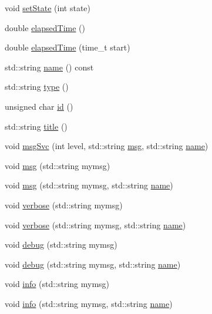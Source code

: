 \begin{DoxyCompactItemize}
void \hyperlink{classProcessus_ad38cde0f1bcefa00b068e7947b8af927}{set\+State} (int state)
\item 
double \hyperlink{classProcessus_aecca96218c65bc805c988cd95447df55}{elapsed\+Time} ()
\item 
double \hyperlink{classProcessus_a06d3815ad56593dfd0d3c1f534f8b146}{elapsed\+Time} (time\+\_\+t start)
\item 
std\+::string \hyperlink{classObject_a300f4c05dd468c7bb8b3c968868443c1}{name} () const
\item 
std\+::string \hyperlink{classObject_a84f99f70f144a83e1582d1d0f84e4e62}{type} ()
\item 
unsigned char \hyperlink{classObject_af99145335cc61ff6e2798ea17db009d2}{id} ()
\item 
std\+::string \hyperlink{classObject_a73a0f1a41828fdd8303dd662446fb6c3}{title} ()
\item 
void \hyperlink{classObject_a3f9d5537ebce0c0f2bf6ae4d92426f3c}{msg\+Svc} (int level, std\+::string \hyperlink{classObject_a58b2d0618c2d08cf2383012611528d97}{msg}, std\+::string \hyperlink{classObject_a300f4c05dd468c7bb8b3c968868443c1}{name})
\item 
void \hyperlink{classObject_a58b2d0618c2d08cf2383012611528d97}{msg} (std\+::string mymsg)
\item 
void \hyperlink{classObject_ac5d59299273cee27aacf7de00d2e7034}{msg} (std\+::string mymsg, std\+::string \hyperlink{classObject_a300f4c05dd468c7bb8b3c968868443c1}{name})
\item 
void \hyperlink{classObject_a83d2db2df682907ea1115ad721c1c4a1}{verbose} (std\+::string mymsg)
\item 
void \hyperlink{classObject_a2d4120195317e2a3c6532e8bb9f3da68}{verbose} (std\+::string mymsg, std\+::string \hyperlink{classObject_a300f4c05dd468c7bb8b3c968868443c1}{name})
\item 
void \hyperlink{classObject_aac010553f022165573714b7014a15f0d}{debug} (std\+::string mymsg)
\item 
void \hyperlink{classObject_a6c9a0397ca804e04d675ed05683f5420}{debug} (std\+::string mymsg, std\+::string \hyperlink{classObject_a300f4c05dd468c7bb8b3c968868443c1}{name})
\item 
void \hyperlink{classObject_a644fd329ea4cb85f54fa6846484b84a8}{info} (std\+::string mymsg)
\item 
void \hyperlink{classObject_a1ca123253dfd30fc28b156f521dcbdae}{info} (std\+::string mymsg, std\+::string \hyperlink{classObject_a300f4c05dd468c7bb8b3c968868443c1}{name})

\end{DoxyCompactItemize}
